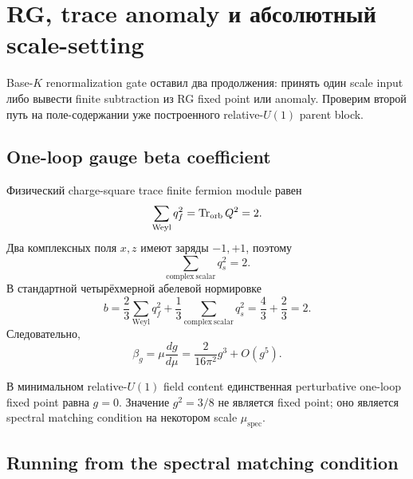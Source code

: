 \chapter{RG, trace anomaly и абсолютный scale-setting}

Base-\(K\) renormalization gate оставил два продолжения: принять один
scale input либо вывести finite subtraction из RG fixed point или anomaly.
Проверим второй путь на поле-содержании уже построенного relative-\(U(1)\)
parent block.

\section{One-loop gauge beta coefficient}

Физический charge-square trace finite fermion module равен
\begin{equation}
 \sum_{\mathrm{Weyl}}q_f^2
 =\operatorname{Tr}_{\mathrm{orb}}Q^2=2.
\end{equation}
Два комплексных поля \(x,z\) имеют заряды \(-1,+1\), поэтому
\begin{equation}
 \sum_{\mathrm{complex\ scalar}}q_s^2=2.
\end{equation}
В стандартной четырёхмерной абелевой нормировке
\begin{equation}
 b
 =
 \frac23\sum_{\mathrm{Weyl}}q_f^2
 +\frac13\sum_{\mathrm{complex\ scalar}}q_s^2
 =\frac43+\frac23=2.
\end{equation}
Следовательно,
\begin{equation}
 \beta_g
 =\mu\frac{dg}{d\mu}
 =\frac{2}{16\pi^2}g^3
 +O(g^5).
\end{equation}

\begin{proposition}
В минимальном relative-\(U(1)\) field content единственная perturbative
one-loop fixed point равна \(g=0\). Значение \(g^2=3/8\) не является
fixed point; оно является spectral matching condition на некотором scale
\(\mu_{\mathrm{spec}}\).
\end{proposition}

\section{Running from the spectral matching condition}

